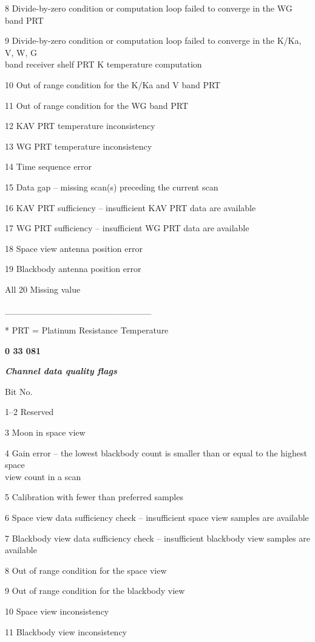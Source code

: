 8 Divide-by-zero condition or computation loop failed to converge in the WG band PRT

9 Divide-by-zero condition or computation loop failed to converge in the K/Ka, V, W, G\\
band receiver shelf PRT K temperature computation

10 Out of range condition for the K/Ka and V band PRT

11 Out of range condition for the WG band PRT

12 KAV PRT temperature inconsistency

13 WG PRT temperature inconsistency

14 Time sequence error

15 Data gap -- missing scan(s) preceding the current scan

16 KAV PRT sufficiency -- insufficient KAV PRT data are available

17 WG PRT sufficiency -- insufficient WG PRT data are available

18 Space view antenna position error

19 Blackbody antenna position error

All 20 Missing value

\_\_\_\_\_\_\_\_\_\_\_\_\_\_\_\_\_\_\_\_\_\_\_

* PRT = Platinum Resistance Temperature

\textbf{0 33 081}

\emph{\textbf{Channel data quality flags}}

Bit No.

1--2 Reserved

3 Moon in space view

4 Gain error -- the lowest blackbody count is smaller than or equal to the highest space\\
view count in a scan

5 Calibration with fewer than preferred samples

6 Space view data sufficiency check -- insufficient space view samples are available

7 Blackbody view data sufficiency check -- insufficient blackbody view samples are available

8 Out of range condition for the space view

9 Out of range condition for the blackbody view

10 Space view inconsistency

11 Blackbody view inconsistency


